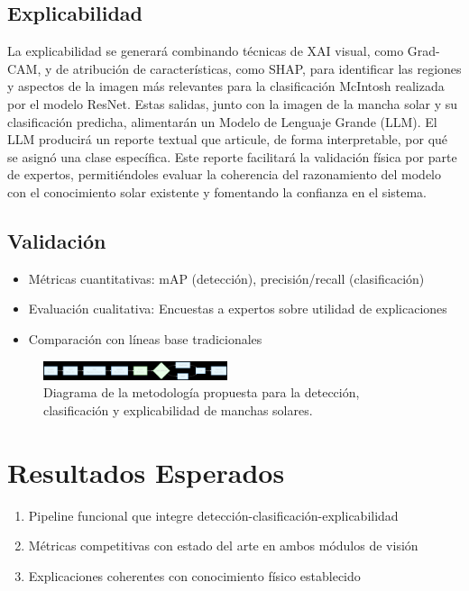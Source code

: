 \documentclass[conference]{IEEEtran}
\begin{document}
\subsection*{Explicabilidad}
La explicabilidad se generará combinando técnicas de XAI visual, como Grad-CAM, y de atribución de características, como SHAP, para identificar las regiones y aspectos de la imagen más relevantes para la clasificación McIntosh realizada por el modelo ResNet. Estas salidas, junto con la imagen de la mancha solar y su clasificación predicha, alimentarán un Modelo de Lenguaje Grande (LLM). El LLM producirá un reporte textual que articule, de forma interpretable, por qué se asignó una clase específica. Este reporte facilitará la validación física por parte de expertos, permitiéndoles evaluar la coherencia del razonamiento del modelo con el conocimiento solar existente y fomentando la confianza en el sistema.


\subsection*{Validación}
\begin{itemize}
    \item Métricas cuantitativas: mAP (detección), precisión/recall (clasificación)
    \item Evaluación cualitativa: Encuestas a expertos sobre utilidad de explicaciones
    \item Comparación con líneas base tradicionales
\end{itemize}


\begin{figure}[ht]
    \centering
    \includegraphics[width=0.48\textwidth]{diagrama_metodologia-2.png}
    \caption{Diagrama de la metodología propuesta para la detección, clasificación y explicabilidad de manchas solares.}
    \label{fig:metodologia}
\end{figure}

\section*{Resultados Esperados}
\begin{enumerate}
    \item Pipeline funcional que integre detección-clasificación-explicabilidad
    \item Métricas competitivas con estado del arte en ambos módulos de visión
    \item Explicaciones coherentes con conocimiento físico establecido
\end{enumerate}
\end{document}
